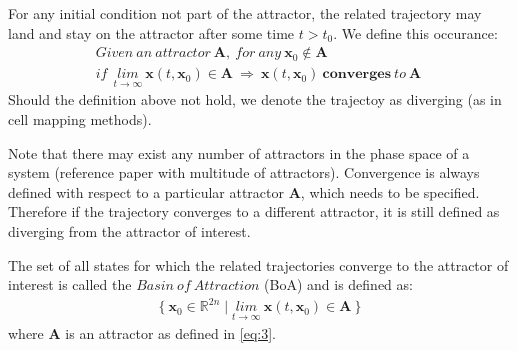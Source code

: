     For any initial condition not part of the attractor, the related trajectory may land and stay on the attractor after some time $t > t_0$. We define this occurance: 
    \begin{gather} Given\ an\ attractor\ \mathbf{A},\ for\ any\ \mathbf{x}_0 \notin \mathbf{A}\\ if\ \ \underset{t \rightarrow \infty}{lim} \ \mathbf{x}(t,\mathbf{x}_0) \in \mathbf{A}\ \Rightarrow\
    \mathbf{x}(t,\mathbf{x}_0)\ \mathbf{converges}\ to\ \mathbf{A}\  \end{gather}
    Should the definition above not hold, we denote the trajectoy as diverging (as in cell mapping methods). 

    Note that there may exist any number of attractors in the phase space of a system (reference paper with multitude of attractors). Convergence is always defined with respect to a particular attractor $\mathbf{A}$, which needs to be specified. Therefore if the trajectory converges to a different attractor, it is still defined as diverging from the attractor of interest.  

    The set of all states for which the related trajectories converge to the attractor of interest is called the $Basin\ of\ Attraction$ (BoA) and is defined as: 
    \begin{gather} \{\ \mathbf{x}_0 \in \mathbb{R}^{2n} \mid  \underset{t \rightarrow \infty}{lim} \ \mathbf{x}(t,\mathbf{x}_0) \in \mathbf{A}\ \}\end{gather}
    where $\mathbf{A}$ is an attractor as defined in \ref{eq:3}.







